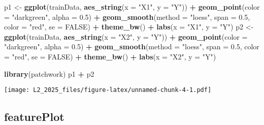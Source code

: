 \documentclass[
]{article}
\newenvironment{Shaded}{\begin{snugshade}}{\end{snugshade}}
\newcommand{\AttributeTok}[1]{\textcolor[rgb]{0.13,0.29,0.53}{#1}}
\newcommand{\ConstantTok}[1]{\textcolor[rgb]{0.56,0.35,0.01}{#1}}
\newcommand{\FloatTok}[1]{\textcolor[rgb]{0.00,0.00,0.81}{#1}}
\newcommand{\FunctionTok}[1]{\textcolor[rgb]{0.13,0.29,0.53}{\textbf{#1}}}
\newcommand{\NormalTok}[1]{#1}
\newcommand{\OtherTok}[1]{\textcolor[rgb]{0.56,0.35,0.01}{#1}}
\newcommand{\SpecialCharTok}[1]{\textcolor[rgb]{0.81,0.36,0.00}{\textbf{#1}}}
\newcommand{\StringTok}[1]{\textcolor[rgb]{0.31,0.60,0.02}{#1}}
\begin{document}
\begin{Shaded}
\begin{Highlighting}[]
\NormalTok{p1 }\OtherTok{\textless{}{-}} \FunctionTok{ggplot}\NormalTok{(trainData, }\FunctionTok{aes\_string}\NormalTok{(}\AttributeTok{x =} \StringTok{"X1"}\NormalTok{, }\AttributeTok{y =} \StringTok{"Y"}\NormalTok{)) }\SpecialCharTok{+}
  \FunctionTok{geom\_point}\NormalTok{(}\AttributeTok{color =} \StringTok{"darkgreen"}\NormalTok{, }\AttributeTok{alpha =} \FloatTok{0.5}\NormalTok{) }\SpecialCharTok{+}
  \FunctionTok{geom\_smooth}\NormalTok{(}\AttributeTok{method =} \StringTok{"loess"}\NormalTok{, }\AttributeTok{span =} \FloatTok{0.5}\NormalTok{, }\AttributeTok{color =} \StringTok{"red"}\NormalTok{, }\AttributeTok{se =} \ConstantTok{FALSE}\NormalTok{) }\SpecialCharTok{+}
  \FunctionTok{theme\_bw}\NormalTok{() }\SpecialCharTok{+}
  \FunctionTok{labs}\NormalTok{(}\AttributeTok{x =} \StringTok{"X1"}\NormalTok{, }\AttributeTok{y =} \StringTok{"Y"}\NormalTok{)}
\NormalTok{p2 }\OtherTok{\textless{}{-}} \FunctionTok{ggplot}\NormalTok{(trainData, }\FunctionTok{aes\_string}\NormalTok{(}\AttributeTok{x =} \StringTok{"X2"}\NormalTok{, }\AttributeTok{y =} \StringTok{"Y"}\NormalTok{)) }\SpecialCharTok{+}
  \FunctionTok{geom\_point}\NormalTok{(}\AttributeTok{color =} \StringTok{"darkgreen"}\NormalTok{, }\AttributeTok{alpha =} \FloatTok{0.5}\NormalTok{) }\SpecialCharTok{+}
  \FunctionTok{geom\_smooth}\NormalTok{(}\AttributeTok{method =} \StringTok{"loess"}\NormalTok{, }\AttributeTok{span =} \FloatTok{0.5}\NormalTok{, }\AttributeTok{color =} \StringTok{"red"}\NormalTok{, }\AttributeTok{se =} \ConstantTok{FALSE}\NormalTok{) }\SpecialCharTok{+}
  \FunctionTok{theme\_bw}\NormalTok{() }\SpecialCharTok{+}
  \FunctionTok{labs}\NormalTok{(}\AttributeTok{x =} \StringTok{"X2"}\NormalTok{, }\AttributeTok{y =} \StringTok{"Y"}\NormalTok{)}

\FunctionTok{library}\NormalTok{(patchwork)}
\NormalTok{p1 }\SpecialCharTok{+}\NormalTok{ p2}
\end{Highlighting}
\end{Shaded}

\texttt{[image: L2\_2025\_files/figure-latex/unnamed-chunk-4-1.pdf]}

\subsection{featurePlot}\label{featureplot}
\end{document}
